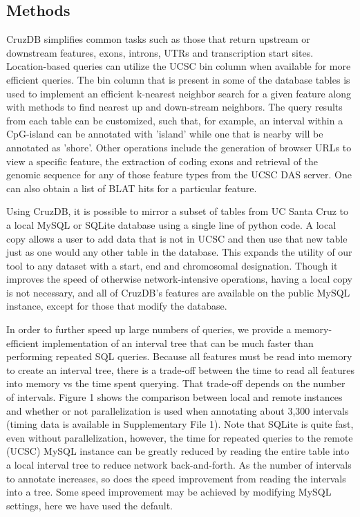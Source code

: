 \documentclass{bioinfo}
\begin{document}
\begin{methods}
\section{Methods}

CruzDB simplifies common tasks such as those that return upstream or downstream features, exons, introns, UTRs and transcription start sites. Location-based queries can utilize the UCSC bin column \citep{KentBrowser} when available for more efficient queries. The bin column that is present in some of the database tables is used to implement an efficient k-nearest neighbor search for a given feature along with methods to find nearest up and down-stream neighbors. The query results from each table can be customized, such that, for example, an interval within a CpG-island can be annotated with 'island' while one that is nearby will be annotated as 'shore'. Other operations include the generation of browser URLs to view a specific feature, the extraction of coding exons and retrieval of the genomic sequence for any of those feature types from the UCSC DAS server. One can also obtain a list of BLAT \citep{KentBLAT} hits for a particular feature.

Using CruzDB, it is possible to mirror a subset of tables from UC Santa Cruz to a local MySQL or SQLite database using a single line of python code. A local copy allows a user to add data that is not in UCSC and then use that new table just as one would any other table in the database. This expands the utility of our tool to any dataset with a start, end and chromosomal designation. Though it improves the speed of otherwise network-intensive operations, having a local copy is not necessary, and all of CruzDB's features are available on the public MySQL instance, except for those that modify the database.

In order to further speed up large numbers of queries, we provide a memory-efficient implementation of an interval tree that can be much faster than performing repeated SQL queries. Because all features must be read into memory to create an interval tree, there is a trade-off between the time to read all features into memory vs the time spent querying. That trade-off depends on the number of intervals. Figure 1 shows the comparison between local and remote instances and whether or not parallelization is used when annotating about 3,300 intervals (timing data is available in Supplementary File 1). Note that SQLite is quite fast, even without parallelization, however, the time for repeated queries to the remote (UCSC) MySQL instance can be greatly reduced by reading the entire table into a local interval tree to reduce network back-and-forth. As the number of intervals to annotate increases, so does the speed improvement from reading the intervals into a tree. Some speed improvement may be achieved by modifying MySQL settings, here we have used the default.


\end{methods}
\end{document}
